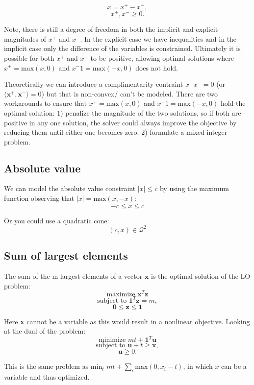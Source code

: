 \documentclass{article}
\begin{document}
$$x = x^+ - x^-,$$
$$x^+, x^- \geq 0.$$

Note, there is still a degree of freedom in both the implicit and explicit magnitudes of $x^+$ and $x^-$. In the
explicit case we have inequalities and in the implicit case only the difference of the variables is constrained.
Ultimately it is possible for both $x^+$ and $x^-$ to be positive, allowing optimal solutions where $x^+ = \text{max}(x,0)$
and $x^-1=\text{max}(-x,0)$ does not hold.

Theoretically we can introduce a complimentarity contraint $x^+x^-=0$ (or $\langle\textbf{x}^+,\textbf{x}^-\rangle=0$)
but that is non-convex/ can't be modeled. There are two workarounds to ensure that $x^+ = \text{max}(x,0)$
and $x^-1=\text{max}(-x,0)$ hold the optimal solution: 1) penalize the magnitude of the two solutions, so if both
are positive in any one solution, the solver could always improve the objective by reducing them until either one
becomes zero. 2) formulate a mixed integer problem.

\subsection{Absolute value}
We can model the absolute value constraint $|x| \leq c$ by using the maximum function observing that
$|x|=\text{max}(x,-x)$:
$$-c\leq x\leq c$$

Or you could use a quadratic cone:
$$(c,x)\in \mathcal{Q}^2$$

\subsection{Sum of largest elements}

The sum of the m largest elements of a vector $\mathbf{x}$ is the optimal solution of the LO problem:
$$\text{maximize } \mathbf{x}^T\mathbf{z}$$
$$\text{subject to } \mathbf{1}^T\mathbf{z}=m,$$
$$\mathbf{0}\leq\mathbf{z}\leq\mathbf{1}$$

Here \textbf{x} cannot be a variable as this would result in a nonlinear objective. Looking at the dual of
the problem:
$$\text{minimize } mt + \mathbf{1}^T\mathbf{u}$$
$$\text{subject to } \mathbf{u} + t \geq \mathbf{x},$$
$$\mathbf{u} \geq 0.$$

This is the same problem as min$_t$ $mt + \sum_i\text{max}(0,x_i-t)$, in which $x$ can be a variable and thus optimized.
\end{document}
